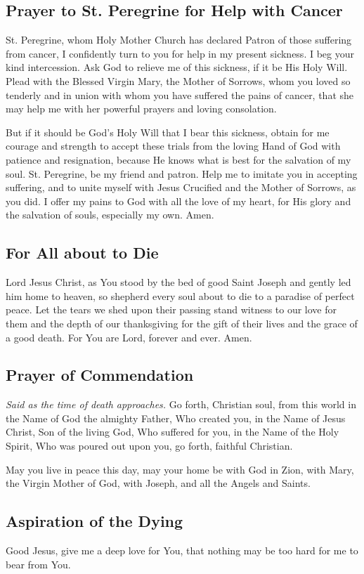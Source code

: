 \documentclass[12pt]{article}
\newcommand{\prayertitle}[1]{\subsection{#1}}
\newcommand{\emphasis}[1]{\emph{#1}}
\newcommand{\emphasis}[1]{\textsl{#1}}
\newcommand{\note}[1]{{\small{\emphasis{#1}}}\newline}
\begin{document}
\prayertitle{Prayer to St. Peregrine for Help with Cancer}
St. Peregrine, whom Holy Mother Church has declared Patron of those suffering from cancer, I confidently turn to you for help in my present sickness.
I beg your kind intercession.
Ask God to relieve me of this sickness, if it be His Holy Will.
Plead with the Blessed Virgin Mary, the Mother of Sorrows, whom you loved so tenderly and in union with whom you have suffered the pains of cancer, that she may help me with her powerful prayers and loving consolation.

But if it should be God's Holy Will that I bear this sickness, obtain for me courage and strength to accept these trials from the loving Hand of God with patience and resignation, because He knows what is best for the salvation of my soul.
St. Peregrine, be my friend and patron.
Help me to imitate you in accepting suffering, and to unite myself with Jesus Crucified and the Mother of Sorrows, as you did.
I offer my pains to God with all the love of my heart, for His glory and the salvation of souls, especially my own.
Amen.

\prayertitle{For All about to Die}
Lord Jesus Christ, as You stood by the bed of good Saint Joseph and gently led him home to heaven, so shepherd every soul about to die to a paradise of perfect peace.
Let the tears we shed upon their passing stand witness to our love for them and the depth of our thanksgiving for the gift of their lives and the grace of a good death.
For You are Lord, forever and ever.
Amen.

\prayertitle{Prayer of Commendation}
\note{Said as the time of death approaches.}
Go forth, Christian soul, from this world in the Name of God the almighty Father, Who created you, in the Name of Jesus Christ, Son of the living God, Who suffered for you, in the Name of the Holy Spirit, Who was poured out upon you, go forth, faithful Christian.

May you live in peace this day, may your home be with God in Zion, with Mary, the Virgin Mother of God, with Joseph, and all the Angels and Saints.

\prayertitle{Aspiration of the Dying}
Good Jesus, give me a deep love for You, that nothing may be too hard for me to bear from You.
\end{document}
